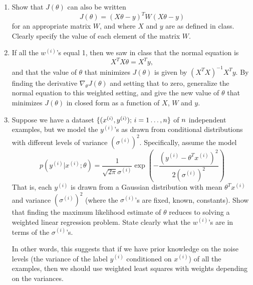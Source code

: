 \begin{enumerate}
	\item {} Show that $J(\theta)$ can also be written
    \begin{equation*}
    J(\theta) = (X\theta - {y})^T W (X\theta - {y})
    \end{equation*}
    for an appropriate matrix $W$, and where $X$ and ${y}$ are as
    defined in class. Clearly specify the value of each element of the matrix
    $W$.

	\item \label{item:lwr-solution}  If all the $w^{(i)}$'s
    equal 1, then we saw in class that the normal equation is
    \begin{equation*}
    X^TX\theta = X^T{y},
    \end{equation*}
	and that the value of $\theta$ that minimizes $J(\theta)$ is given by
	$(X^TX)^{-1}X^T{y}.$
	By finding the derivative $\nabla_\theta J(\theta)$ and setting that to zero,
	generalize
	the normal equation to this weighted setting, and give the new value of
	$\theta$ that minimizes
    $J(\theta)$ in closed form as a function of $X$, $W$ and ${y}$.

	\item {} Suppose we have a dataset
	$\{(x^{(i)}, y^{(i)});\, i=1\ldots,{n}\}$ of ${n}$ independent examples, but
    we model the $y^{(i)}$'s as drawn from conditional distributions with
    different levels of variance $(\sigma^{(i)})^2$. Specifically, assume the
    model
    \begin{equation*}
		p(y^{(i)} | x^{(i)} ; \theta) = \frac{1}{\sqrt{2\pi}\sigma^{(i)}} \exp\left(-
		\frac{(y^{(i)} - \theta^Tx^{(i)})^2}{2(\sigma^{(i)})^2}\right)
	\end{equation*}
    That is, each $y^{(i)}$ is drawn from a Gaussian distribution with mean
    $\theta^Tx^{(i)}$ and variance $(\sigma^{(i)})^2$ (where the
    $\sigma^{(i)}$'s are fixed, known, constants). Show that finding the
    maximum likelihood estimate of $\theta$ reduces to solving a weighted
	linear regression problem.  State clearly what the $w^{(i)}$'s are in terms of
    the $\sigma^{(i)}$'s.

	In other words, this suggests that if we have prior knowledge on the noise levels (the variance of the label $y^{(i)}$ conditioned on $x^{(i)}$) of all the examples, then we should use weighted least squares with weights depending on the variances. 
\end{enumerate}

